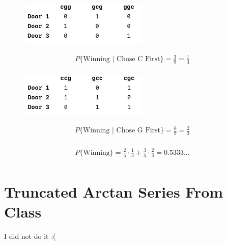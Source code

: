 \documentclass{article}
\begin{document}
\vspace{15pt}
\begin{multicols}{2}
\begin{figure}[H]
	\centering
	\includegraphics[width=0.75\linewidth]{../drawings/p3_2}
\end{figure}
\vspace{-25pt}
\begin{align*}
P\{\text{Winning | Chose C First}\} = \frac{3}{9} = \frac{1}{3}\\
\end{align*}



\columnbreak
\begin{figure}[H]
	\centering
	\includegraphics[width=0.75\linewidth]{../drawings/p3_3}
\end{figure}
\vspace{-25pt}
\begin{align*}
P\{\text{Winning | Chose G First}\} = \frac{6}{9} = \frac{2}{3} \\
\end{align*}

\end{multicols}

\begin{align*}
	P\{\text{Winning}\} = \frac{2}{5}  \cdot \frac{1}{3} + \frac{3}{5}  \cdot \frac{2}{3} = 0.5333...\\
\end{align*}

\section{Truncated Arctan Series From Class}
I did not do it :(
\end{document}
